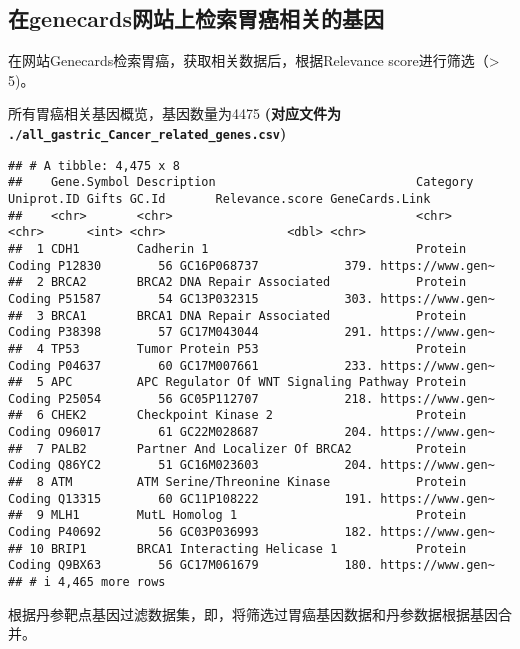 \documentclass[
]{article}
\begin{document}
\hypertarget{ux5728genecardsux7f51ux7ad9ux4e0aux68c0ux7d22ux80c3ux764cux76f8ux5173ux7684ux57faux56e0}{%
\subsection{在genecards网站上检索胃癌相关的基因}\label{ux5728genecardsux7f51ux7ad9ux4e0aux68c0ux7d22ux80c3ux764cux76f8ux5173ux7684ux57faux56e0}}

在网站Genecards检索胃癌，获取相关数据后，根据Relevance score进行筛选（\textgreater{} 5)。

所有胃癌相关基因概览，基因数量为4475
\textbf{(对应文件为 \texttt{./all\_gastric\_Cancer\_related\_genes.csv})}

\begin{verbatim}
## # A tibble: 4,475 x 8
##    Gene.Symbol Description                            Category       Uniprot.ID Gifts GC.Id       Relevance.score GeneCards.Link  
##    <chr>       <chr>                                  <chr>          <chr>      <int> <chr>                 <dbl> <chr>           
##  1 CDH1        Cadherin 1                             Protein Coding P12830        56 GC16P068737            379. https://www.gen~
##  2 BRCA2       BRCA2 DNA Repair Associated            Protein Coding P51587        54 GC13P032315            303. https://www.gen~
##  3 BRCA1       BRCA1 DNA Repair Associated            Protein Coding P38398        57 GC17M043044            291. https://www.gen~
##  4 TP53        Tumor Protein P53                      Protein Coding P04637        60 GC17M007661            233. https://www.gen~
##  5 APC         APC Regulator Of WNT Signaling Pathway Protein Coding P25054        56 GC05P112707            218. https://www.gen~
##  6 CHEK2       Checkpoint Kinase 2                    Protein Coding O96017        61 GC22M028687            204. https://www.gen~
##  7 PALB2       Partner And Localizer Of BRCA2         Protein Coding Q86YC2        51 GC16M023603            204. https://www.gen~
##  8 ATM         ATM Serine/Threonine Kinase            Protein Coding Q13315        60 GC11P108222            191. https://www.gen~
##  9 MLH1        MutL Homolog 1                         Protein Coding P40692        56 GC03P036993            182. https://www.gen~
## 10 BRIP1       BRCA1 Interacting Helicase 1           Protein Coding Q9BX63        56 GC17M061679            180. https://www.gen~
## # i 4,465 more rows
\end{verbatim}

根据丹参靶点基因过滤数据集，即，将筛选过胃癌基因数据和丹参数据根据基因合并。
\end{document}
